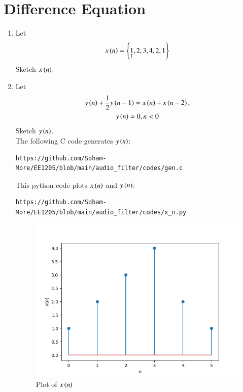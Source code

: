 \documentclass[journal,12pt,twocolumn]{IEEEtran}
\theoremstyle{remark}
\begin{document}
\section{Difference Equation}
\begin{enumerate}[label=\thesection.\arabic*,ref=\thesection.\theenumi]
\item Let
\begin{equation}
x\left(n\right) = \left\{\underset{\uparrow}{1},2,3,4,2,1\right\} \label{prob:2.1}
\end{equation}
Sketch $x\left(n\right)$. 

\item Let
\begin{multline}
y\left(n\right) + \frac{1}{2}y\left(n - 1\right) = x\left(n\right) + x\left(n-2\right), 
\\
y\left(n\right) = 0, n < 0 \label{prob:2.2}
\end{multline}
Sketch $y\left(n\right)$.\\

\solution The following C code generates $y\left(n\right)$:
\begin{lstlisting}
https://github.com/Soham-More/EE1205/blob/main/audio_filter/codes/gen.c
\end{lstlisting}
This python code plots $x\left(n\right)$ and $y\left(n\right)$:
\begin{lstlisting}
https://github.com/Soham-More/EE1205/blob/main/audio_filter/codes/x_n.py
\end{lstlisting}

\begin{figure}[ht]
    \includegraphics[width=0.8\columnwidth]{figs/x_n.png}
    \caption{Plot of $x\left(n\right)$}
\end{figure}


\end{enumerate}
\end{document}
